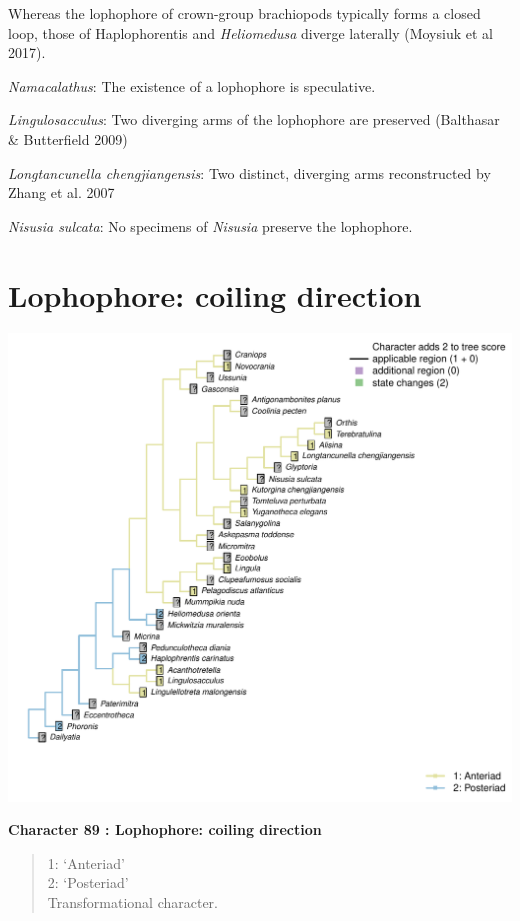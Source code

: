 \documentclass[]{book}
\theoremstyle{definition}
\theoremstyle{definition}
\theoremstyle{definition}
\theoremstyle{remark}
\begin{document}
Whereas the lophophore of crown-group brachiopods typically forms a
closed loop, those of Haplophorentis and \emph{Heliomedusa} diverge
laterally (Moysiuk et al 2017).

\emph{Namacalathus}: The existence of a lophophore is speculative.

\emph{Lingulosacculus}: Two diverging arms of the lophophore are
preserved (Balthasar \& Butterfield 2009)

\emph{Longtancunella chengjiangensis}: Two distinct, diverging arms
reconstructed by Zhang et al. 2007

\emph{Nisusia sulcata}: No specimens of \emph{Nisusia} preserve the
lophophore.

\hypertarget{lophophore-coiling-direction}{%
\section*{Lophophore: coiling
direction}\label{lophophore-coiling-direction}}

\includegraphics{Brachiopod_phylogeny_files/figure-latex/unnamed-chunk-5-89.pdf}

\textbf{Character 89 : Lophophore: coiling direction }

\begin{quote}
1: `Anteriad'\\
2: `Posteriad'\\
Transformational character.
\end{quote}
\end{document}
